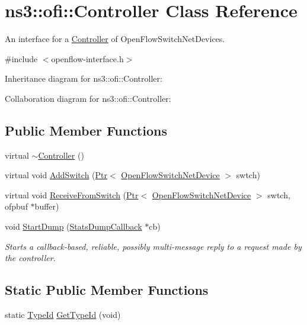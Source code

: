 \hypertarget{classns3_1_1ofi_1_1Controller}{}\section{ns3\+:\+:ofi\+:\+:Controller Class Reference}
\label{classns3_1_1ofi_1_1Controller}


An interface for a \hyperlink{classns3_1_1ofi_1_1Controller}{Controller} of Open\+Flow\+Switch\+Net\+Devices.  




{\ttfamily \#include $<$openflow-\/interface.\+h$>$}



Inheritance diagram for ns3\+:\+:ofi\+:\+:Controller\+:


Collaboration diagram for ns3\+:\+:ofi\+:\+:Controller\+:
\subsection*{Public Member Functions}
\begin{DoxyCompactItemize}
\item 
virtual \hyperlink{classns3_1_1ofi_1_1Controller_aa678943b8215a7cbbd148fa390b6959b}{$\sim$\+Controller} ()
\item 
virtual void \hyperlink{classns3_1_1ofi_1_1Controller_ad594dccd22650ed5d2c9ee8b3d204290}{Add\+Switch} (\hyperlink{classns3_1_1Ptr}{Ptr}$<$ \hyperlink{classns3_1_1OpenFlowSwitchNetDevice}{Open\+Flow\+Switch\+Net\+Device} $>$ swtch)
\item 
virtual void \hyperlink{classns3_1_1ofi_1_1Controller_a7b2be41ec5105913230a84a6fd18d9c4}{Receive\+From\+Switch} (\hyperlink{classns3_1_1Ptr}{Ptr}$<$ \hyperlink{classns3_1_1OpenFlowSwitchNetDevice}{Open\+Flow\+Switch\+Net\+Device} $>$ swtch, ofpbuf $\ast$buffer)
\item 
void \hyperlink{classns3_1_1ofi_1_1Controller_ab45914c81455ec82bbc00d9cc4b0513f}{Start\+Dump} (\hyperlink{structns3_1_1ofi_1_1StatsDumpCallback}{Stats\+Dump\+Callback} $\ast$cb)
\begin{DoxyCompactList}\small\item\em Starts a callback-\/based, reliable, possibly multi-\/message reply to a request made by the controller. \end{DoxyCompactList}\end{DoxyCompactItemize}
\subsection*{Static Public Member Functions}
\begin{DoxyCompactItemize}
\item 
static \hyperlink{classns3_1_1TypeId}{Type\+Id} \hyperlink{classns3_1_1ofi_1_1Controller_a5abda0f7945c517098fb0dd17db7032f}{Get\+Type\+Id} (void)
\end{DoxyCompactItemize}
